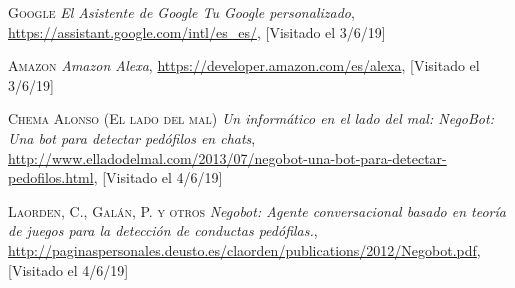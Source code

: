 \documentclass[spanish,12pt, a4paper, twoside]{paper}
\begin{document}
\begin{thebibliography}{00}
 \textsc{Google} \textit{El Asistente de Google \textbar Tu Google personalizado}, \url{https://assistant.google.com/intl/es_es/}, [Visitado el 3/6/19]

 \textsc{Amazon} \textit{Amazon Alexa}, \url{https://developer.amazon.com/es/alexa}, [Visitado el 3/6/19]

 \textsc{Chema Alonso (El lado del mal)} \textit{Un informático en el lado del mal: NegoBot: Una bot para detectar pedófilos en chats}, \url{http://www.elladodelmal.com/2013/07/negobot-una-bot-para-detectar-pedofilos.html}, [Visitado el 4/6/19]

 \textsc{Laorden, C., Galán, P. y otros} \textit{Negobot: Agente conversacional basado en teoría de juegos para la detección de conductas pedófilas.}, \url{http://paginaspersonales.deusto.es/claorden/publications/2012/Negobot.pdf}, [Visitado el 4/6/19]
\end{thebibliography}
\end{document}
